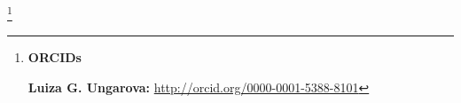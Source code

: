 \documentclass[11pt,a4paper,twoside]{article}
\begin{document}
\RuDate








\newpage





\makeentitle











\thanks{{\bf ORCIDs}








{\bf Luiza G. Ungarova:} \url{http://orcid.org/0000-0001-5388-8101}








}











\EngRef


	
\end{document}
